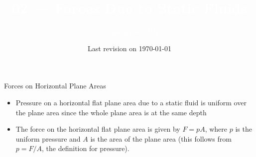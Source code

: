 \documentclass[9pt,xcolor={svgnames, x11names},professionalfonts, mathserif]{beamer}
\title[Static Fluids]{\Huge \textcolor{white}{02 --- Forces Due to Static Fluids}}
\subtitle[CIVL318]{\Large\textcolor{white}{Water Resources, CIVL318}}
\author{}
\institute{}
\date{Last revision on \today}
\begin{document}
\begin{frame}[plain]    %
	\titlepage
\end{frame}


\begin{frame}{Forces on Horizontal Plane Areas}
	\begin{itemize}
		\item Pressure on a horizontal flat plane area due to a static fluid is
		      uniform over the plane area since the whole plane area is at the same depth\par\bigskip
		      \pause
		\item The force on the horizontal flat plane area is given by $F=pA$, where $p$ is the
		      uniform pressure and $A$ is the area of the plane area (this follows from $p=F/A$,
		      the definition for pressure).
	\end{itemize}
\end{frame}



\begin{frame}
\end{frame}



\end{document}
